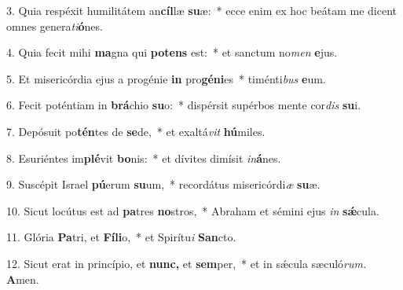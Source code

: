 \item 3. Quia respéxit humilitátem an\textbf{cíl}læ \textbf{su}æ:~* ecce enim ex hoc beátam me dicent omnes genera\hspace{0.03em}\textit{ti}\textbf{ó}nes.

\item 4. Quia fecit mihi \textbf{ma}gna qui \textbf{pot}\textbf{ens} est:~* et sanctum no\textit{men} \textbf{e}jus.

\item 5. Et misericórdia ejus a progénie \textbf{in} pro\textbf{gé}\textbf{ni}es~* timénti\textit{bus} \textbf{e}um.

\item 6. Fecit poténtiam in \textbf{brá}chio \textbf{su}o:~* dispérsit supérbos mente cor\textit{dis} \textbf{su}i.

\item 7. Depósuit po\textbf{tén}tes de \textbf{se}de,~* et exaltá\textit{vit} \textbf{hú}miles.

\item 8. Esuriéntes im\textbf{plé}vit \textbf{bo}nis:~* et dívites dimísit \textit{in}\textbf{á}nes.

\item 9. Suscépit Israel \textbf{pú}erum \textbf{su}um,~* recordátus misericórdi\hspace{0.03em}\textit{æ} \textbf{su}æ.

\item 10. Sicut locútus est ad \textbf{pa}tres \textbf{no}stros,~* Abraham et sémini ejus \textit{in} \textbf{sǽ}cula.

\item 11. Glória \textbf{Pa}tri, et \textbf{Fí}\textbf{li}o,~* et Spirítu\hspace{0.03em}\textit{i} \textbf{San}cto.

\item 12. Sicut erat in princípio, et \textbf{nunc,} et \textbf{sem}per,~* et in sǽcula sæculó\textit{rum.} \textbf{A}men.

